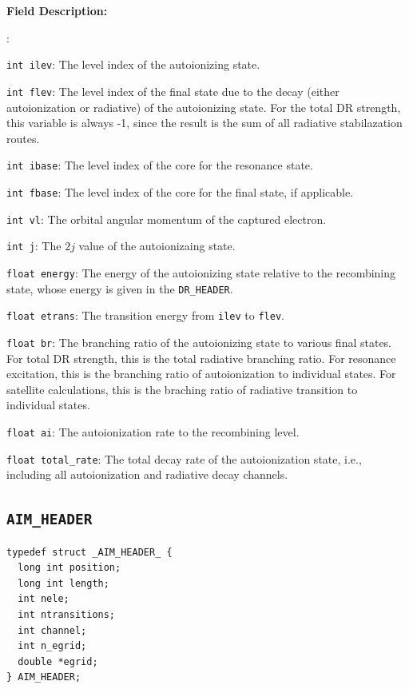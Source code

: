 \documentclass[twoside,letterpaper]{refrep}
\newenvironment{dbdesc}{\textbf{Field Description:} \begin{list}
	{:}{\setlength{\labelwidth}{2in}
	   \setlength{\leftmargin}{2in}
	   \setlength{\labelsep}{0.1in}
	   \setlength{\rightmargin}{0.2in}}}
	{\end{list}}
\begin{document}
\begin{dbdesc}
\item[\texttt{int ilev}:] The level index of the autoionizing state.
\item[\texttt{int flev}:] The level index of the final state due to the decay
(either autoionization or radiative) of the autoionizing state. For the total
DR strength, this variable is always -1, since the result is the sum of all
radiative stabilazation routes.
\item[\texttt{int ibase}:] The level index of the core for the resonance
state. 
\item[\texttt{int fbase}:] The level index of the core for the final
state, if applicable.
\item[\texttt{int vl}:] The orbital angular momentum of the captured
electron. 
\item[\texttt{int j}:] The $2j$ value of the autoionizaing state.
\item[\texttt{float energy}:] The energy of the autoionizing state relative to
the recombining state, whose energy is given in the \texttt{DR\_HEADER}.
\item[\texttt{float etrans}:] The transition energy from \texttt{ilev} to
  \texttt{flev}.
\item[\texttt{float br}:] The branching ratio of the autoionizing state to
various final states. For total DR strength, this is the total radiative
branching ratio. For resonance excitation, this is the branching ratio of
autoionization to individual states. For satellite calculations, this is the
braching ratio of radiative transition to individual states.
\item[\texttt{float ai}:] The autoionization rate to the recombining level.
\item[\texttt{float total\_rate}:] The total decay rate of the autoionization
state, i.e., including all autoionization and radiative decay channels.
\end{dbdesc}

\subsection{\texttt{AIM\_HEADER}}
\begin{verbatim}
typedef struct _AIM_HEADER_ {
  long int position;
  long int length;
  int nele;
  int ntransitions;
  int channel;
  int n_egrid;
  double *egrid;
} AIM_HEADER;
\end{verbatim}
\end{document}
